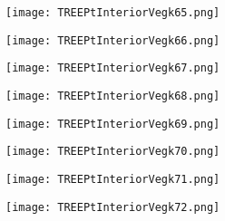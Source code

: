 \documentclass[pdf]{beamer}
\begin{document}
\begin{frame}
\begin{figure}[!h]
\centering
\texttt{[image: TREEPtInteriorVegk65.png]}
\end{figure}
\end{frame}

\begin{frame}
\begin{figure}[!h]
\centering
\texttt{[image: TREEPtInteriorVegk66.png]}
\end{figure}
\end{frame}

\begin{frame}
\begin{figure}[!h]
\centering
\texttt{[image: TREEPtInteriorVegk67.png]}
\end{figure}
\end{frame}

\begin{frame}
\begin{figure}[!h]
\centering
\texttt{[image: TREEPtInteriorVegk68.png]}
\end{figure}
\end{frame}

\begin{frame}
\begin{figure}[!h]
\centering
\texttt{[image: TREEPtInteriorVegk69.png]}
\end{figure}
\end{frame}

\begin{frame}
\begin{figure}[!h]
\centering
\texttt{[image: TREEPtInteriorVegk70.png]}
\end{figure}
\end{frame}

\begin{frame}
\begin{figure}[!h]
\centering
\texttt{[image: TREEPtInteriorVegk71.png]}
\end{figure}
\end{frame}

\begin{frame}
\begin{figure}[!h]
\centering
\texttt{[image: TREEPtInteriorVegk72.png]}
\end{figure}
\end{frame}
\end{document}
